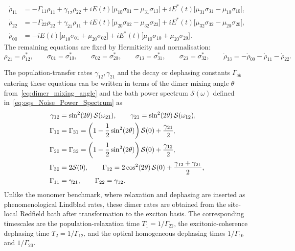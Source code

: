 \begin{align*}
\dot{\rho}_{11}
&=
-\Gamma_{11}\rho_{11}
+ \gamma_{12}\rho_{22}
+ iE(t)\bigl[\mu_{10}\sigma_{01}-\mu_{31}\sigma_{13}\bigr]
+ iE^{*}(t)\bigl[\mu_{31}\sigma_{31}-\mu_{10}\sigma_{10}\bigr],
\\
\dot{\rho}_{22}
&=
-\Gamma_{22}\rho_{22}
+ \gamma_{21}\rho_{11}
+ iE(t)\bigl[\mu_{20}\sigma_{02}-\mu_{32}\sigma_{23}\bigr]
+ iE^{*}(t)\bigl[\mu_{32}\sigma_{32}-\mu_{20}\sigma_{20}\bigr],
\\
\dot{\rho}_{00}
&=
-iE(t)\bigl[\mu_{10}\sigma_{01}+\mu_{20}\sigma_{02}\bigr]
+ iE^{*}(t)\bigl[\mu_{10}\sigma_{10}+\mu_{20}\sigma_{20}\bigr].
\end{align*}
The remaining equations are fixed by Hermiticity and normalisation:
\begin{equation*}
\rho_{21}=\rho_{12}^{*},
\qquad
\sigma_{01}=\sigma_{10}^{*},
\qquad
\sigma_{02}=\sigma_{20}^{*},
\qquad
\sigma_{13}=\sigma_{31}^{*},
\qquad
\sigma_{23}=\sigma_{32}^{*},
\qquad
\dot{\rho}_{33}=-\dot{\rho}_{00}-\dot{\rho}_{11}-\dot{\rho}_{22}.
\end{equation*}

The population-transfer rates \(\gamma_{12},\gamma_{21}\) and the decay or
dephasing constants \(\Gamma_{ab}\) entering these equations can be written in
terms of the dimer mixing angle \(\theta\) from~\autoref{eq:dimer_mixing_angle}
and the bath power spectrum \(\mathcal{S}(\omega)\) defined
in~\autoref{eq:oqs_Noise_Power_Spectrum} as
\begin{align}
\gamma_{12} &= \sin^{2}(2\theta)\,\mathcal{S}(\omega_{21}),
\qquad
\gamma_{21} = \sin^{2}(2\theta)\,\mathcal{S}(\omega_{12}),
\notag\\
\Gamma_{10} &= \Gamma_{31}
= \left(1-\frac{1}{2}\sin^{2}(2\theta)\right)\mathcal{S}(0)
+ \frac{\gamma_{21}}{2},
\notag\\
\Gamma_{20} &= \Gamma_{32}
= \left(1-\frac{1}{2}\sin^{2}(2\theta)\right)\mathcal{S}(0)
+ \frac{\gamma_{12}}{2},
\notag\\
\Gamma_{30} &= 2\mathcal{S}(0),
\qquad
\Gamma_{12} = 2\cos^{2}(2\theta)\,\mathcal{S}(0)
+ \frac{\gamma_{12}+\gamma_{21}}{2},
\label{eq:app_dimer_redfield_rates}\\
\Gamma_{11} &= \gamma_{21},
\qquad
\Gamma_{22} = \gamma_{12}.
\notag
\end{align}
Unlike the monomer benchmark, where relaxation and dephasing are inserted as
phenomenological Lindblad rates, these dimer rates are obtained from the
site-local Redfield bath after transformation to the exciton basis. The
corresponding timescales are the population-relaxation time
\(T_{1}=1/\Gamma_{22}\), the excitonic-coherence dephasing time
\(T_{2}=1/\Gamma_{12}\), and the optical homogeneous dephasing times
\(1/\Gamma_{10}\) and \(1/\Gamma_{20}\).


